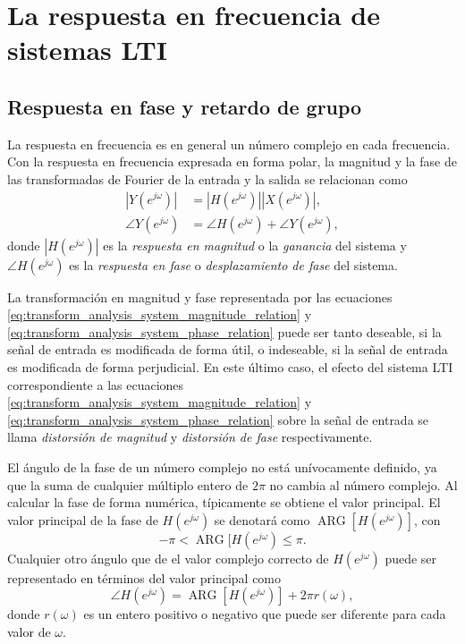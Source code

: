 \documentclass[a4paper]{report}
\DeclareMathOperator{\ARG}{ARG}
\begin{document}
\section{La respuesta en frecuencia de sistemas LTI}\label{sec:transform_analysis_frequency_response_lti}

\subsection{Respuesta en fase y retardo de grupo}

La respuesta en frecuencia es en general un número complejo en cada frecuencia. Con la respuesta en frecuencia expresada en forma polar, la magnitud y la fase de las transformadas de Fourier de la entrada y la salida se relacionan como
\begin{align}
 |Y(e^{j\omega})|&=|H(e^{j\omega})||X(e^{j\omega})|,\label{eq:transform_analysis_system_magnitude_relation}\\
 \angle Y(e^{j\omega})&=\angle H(e^{j\omega})+\angle Y(e^{j\omega}),\label{eq:transform_analysis_system_phase_relation}
\end{align}
donde \(|H(e^{j\omega})|\) es la \emph{respuesta en magnitud} o la \emph{ganancia} del sistema y \(\angle H(e^{j\omega})\) es la \emph{respuesta en fase} o \emph{desplazamiento de fase} del sistema.

La transformación en magnitud y fase representada por las ecuaciones  \ref{eq:transform_analysis_system_magnitude_relation} y \ref{eq:transform_analysis_system_phase_relation} puede ser tanto deseable, si la señal de entrada es modificada de forma útil, o indeseable, si la señal de entrada es modificada de forma perjudicial. En este último caso, el efecto del sistema LTI correspondiente a las ecuaciones  \ref{eq:transform_analysis_system_magnitude_relation} y \ref{eq:transform_analysis_system_phase_relation} sobre la señal de entrada se llama \emph{distorsión de magnitud} y \emph{distorsión de fase} respectivamente.

El ángulo de la fase de un número complejo no está unívocamente definido, ya que la suma de cualquier múltiplo entero de \(2\pi\) no cambia al número complejo. Al calcular la fase de forma numérica, típicamente se obtiene el valor principal. El valor principal de la fase de \(H(e^{j\omega})\) se denotará como \(\ARG[H(e^{j\omega})]\), con 
\[
 -\pi<\ARG[H(e^{j\omega})\leq\pi.
\]
Cualquier otro ángulo que de el valor complejo correcto de \(H(e^{j\omega})\) puede ser representado en términos del valor principal como
\[
 \angle H(e^{j\omega})=\ARG[H(e^{j\omega})]+2\pi r(\omega),
\]
donde \(r(\omega)\) es un entero positivo o negativo que puede ser diferente para cada valor de \(\omega\). 
\end{document}
